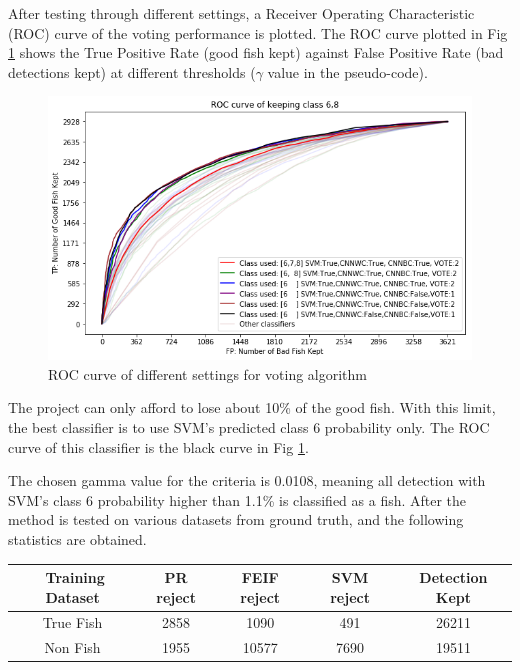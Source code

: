 \documentclass[bsc,logo,twoside,fullspacing,parskip]{infthesis}
\begin{document}
After testing through different settings, a Receiver Operating Characteristic (ROC) curve of the voting performance is plotted.
The ROC curve plotted in Fig \ref{fig:roccurve} shows the True Positive Rate (good fish kept) against False Positive Rate (bad detections kept) at different thresholds ($\gamma$ value in the pseudo-code).

\begin{figure}[ht]
\centering
    \includegraphics[scale=0.6]{graph/roccurve.png}
    \caption{ROC curve of different settings for voting algorithm}
    \label{fig:roccurve}

\vspace{-10pt}
\end{figure} 

The project can only afford to lose about 10\% of the good fish.
With this limit, the best classifier is to use SVM's predicted class 6 probability only.
The ROC curve of this classifier is the black curve in Fig \ref{fig:roccurve}. 

The chosen gamma value for the criteria is 0.0108, meaning all detection with SVM's class 6 probability higher than 1.1\% is classified as a fish.
After the method is tested on various datasets from ground truth, and the following statistics are obtained.

\begin{center}
\begin{tabular}{|c|c|c|c|c|}
\hline 
$ $ Training Dataset & PR reject & FEIF reject & SVM reject & Detection Kept\\
\hline 
True Fish & 2858 & 1090 & 491 & 26211 \\
Non Fish & 1955 & 10577 & 7690 & 19511 \\
\hline 
\end{tabular}
\end{center}
\end{document}
